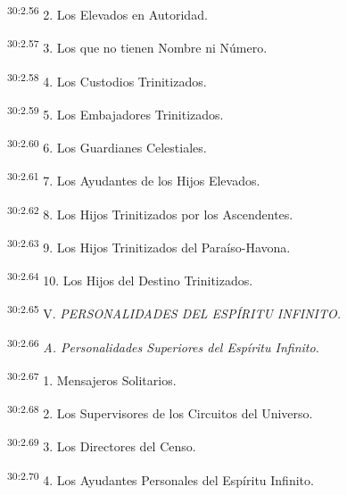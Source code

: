 \par
\textsuperscript{30:2.56} 2. Los Elevados en Autoridad.

\par
\textsuperscript{30:2.57} 3. Los que no tienen Nombre ni Número.

\par
\textsuperscript{30:2.58} 4. Los Custodios Trinitizados.

\par
\textsuperscript{30:2.59} 5. Los Embajadores Trinitizados.

\par
\textsuperscript{30:2.60} 6. Los Guardianes Celestiales.

\par
\textsuperscript{30:2.61} 7. Los Ayudantes de los Hijos Elevados.

\par
\textsuperscript{30:2.62} 8. Los Hijos Trinitizados por los Ascendentes.

\par
\textsuperscript{30:2.63} 9. Los Hijos Trinitizados del Paraíso-Havona.

\par
\textsuperscript{30:2.64} 10. Los Hijos del Destino Trinitizados.

\par
\textsuperscript{30:2.65} V. \textit{PERSONALIDADES DEL ESPÍRITU INFINITO.}

\par
\textsuperscript{30:2.66} \textit{A. Personalidades Superiores del Espíritu Infinito.}

\par
\textsuperscript{30:2.67} 1. Mensajeros Solitarios.

\par
\textsuperscript{30:2.68} 2. Los Supervisores de los Circuitos del Universo.

\par
\textsuperscript{30:2.69} 3. Los Directores del Censo.

\par
\textsuperscript{30:2.70} 4. Los Ayudantes Personales del Espíritu Infinito.

